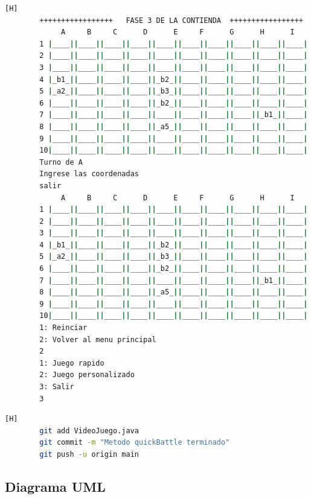 \documentclass{article}
\begin{document}
\begin{lstlisting}[language=bash,caption={Compilando y probando el programa completo  }][H]
		+++++++++++++++++   FASE 3 DE LA CONTIENDA  +++++++++++++++++
			 A     B     C      D      E     F      G      H      I     J 
		1 |____||____||____||____||____||____||____||____||____||____|
		2 |____||____||____||____||____||____||____||____||____||____|
		3 |____||____||____||____||____||____||____||____||____||____|
		4 |_b1_||____||____||____||_b2_||____||____||____||____||____|
		5 |_a2_||____||____||____||_b3_||____||____||____||____||____|
		6 |____||____||____||____||_b2_||____||____||____||____||____|
		7 |____||____||____||____||____||____||____||____||_b1_||____|
		8 |____||____||____||____||_a5_||____||____||____||____||____|
		9 |____||____||____||____||____||____||____||____||____||____|
		10|____||____||____||____||____||____||____||____||____||____|
		Turno de A
		Ingrese las coordenadas
		salir
			 A     B     C      D      E     F      G      H      I     J 
		1 |____||____||____||____||____||____||____||____||____||____|
		2 |____||____||____||____||____||____||____||____||____||____|
		3 |____||____||____||____||____||____||____||____||____||____|
		4 |_b1_||____||____||____||_b2_||____||____||____||____||____|
		5 |_a2_||____||____||____||_b3_||____||____||____||____||____|
		6 |____||____||____||____||_b2_||____||____||____||____||____|
		7 |____||____||____||____||____||____||____||____||_b1_||____|
		8 |____||____||____||____||_a5_||____||____||____||____||____|
		9 |____||____||____||____||____||____||____||____||____||____|
		10|____||____||____||____||____||____||____||____||____||____|
		1: Reinciar
		2: Volver al menu principal
		2
		1: Juego rapido
		2: Juego personalizado
		3: Salir
		3
	\end{lstlisting}
	
	\begin{lstlisting}[language=bash,caption={Commit: a2ccc9dec857e9f4649ee5e6729ac4f3194ffb7d}][H]
		git add VideoJuego.java
		git commit -m "Metodo quickBattle terminado"			
		git push -u origin main
	\end{lstlisting}
	
	
	
	
	
	
	
	
	
	\subsection{Diagrama UML}
	
\end{document}
